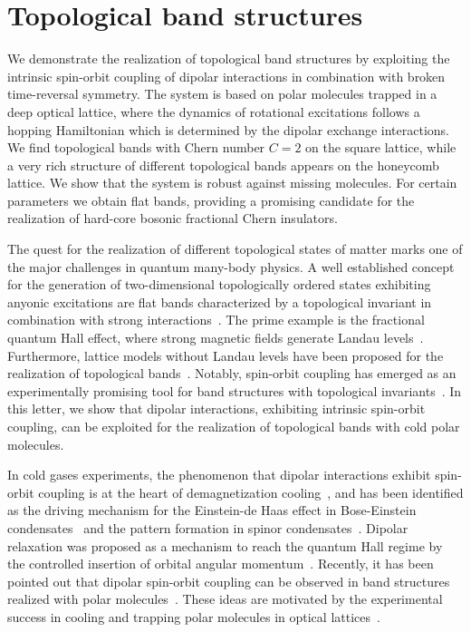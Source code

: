\chapter{Topological band structures}
\label{topological_bands}

We demonstrate the realization of topological band structures by exploiting the intrinsic spin-orbit coupling of dipolar interactions in combination with broken time-reversal symmetry.
The system is based on polar molecules trapped in a deep optical lattice, where the dynamics of rotational excitations follows a hopping Hamiltonian which is determined by the dipolar exchange interactions.
We find topological bands with Chern number $C=2$ on the square lattice, while a very rich structure of different topological bands appears on the honeycomb lattice.
We show that the system is robust against missing molecules.
For certain parameters we obtain flat bands, providing a promising candidate for the realization of hard-core bosonic fractional Chern insulators.

The quest for the realization of different topological states of matter marks one of the major challenges in quantum many-body physics.
A well established concept for the generation of two-dimensional topologically ordered states exhibiting anyonic excitations are flat bands characterized by a topological invariant in combination with strong interactions~\cite{Bergholtz2013,Parameswaran2013}.
The prime example is the fractional quantum Hall effect, where strong magnetic fields generate Landau levels~\cite{Nayak2008}.
Furthermore, lattice models without Landau levels have been proposed for the realization of topological bands~\cite{Haldane1988,Raghu2008,Wang2011,Neupert2011,Wang2012a,Grushin2012,Moller2009,Sun2010,Barkeshli2012,Wang2011a,Sterdyniak2013,Liu2012,Yao2013,Yang2012,Dauphin2012,Cooper2012,Cooper2013,Shi2013}.
Notably, spin-orbit coupling has emerged as an experimentally promising tool for band structures with topological invariants~\cite{Kane2005,Pesin2009,Qi2011,Hasan2010,Tang2011,Qiao2011}.
In this letter, we show that dipolar interactions, exhibiting intrinsic spin-orbit coupling, can be exploited for the realization of topological bands with cold polar molecules.

In cold gases experiments, the phenomenon that dipolar interactions exhibit spin-orbit coupling is at the heart of demagnetization cooling~\cite{Hensler2003,Fattori2006,Pasquiou2011,DePaz2013a},
and has been identified as the driving mechanism for the Einstein-de Haas effect in Bose-Einstein condensates~\cite{Kawaguchi2006} and the pattern formation in spinor condensates~\cite{Santos2006,Vengalattore2008,Kurn2013}.
Dipolar relaxation was proposed as a mechanism to reach the quantum Hall regime by the controlled insertion of orbital angular momentum~\cite{Peter2013}.
Recently, it has been pointed out that dipolar spin-orbit coupling can be observed in band structures realized with polar molecules~\cite{Syzranov2014}.
These ideas are motivated by the experimental success in cooling and trapping polar molecules in optical lattices~\cite{Ni2008b,Yan2013}.

